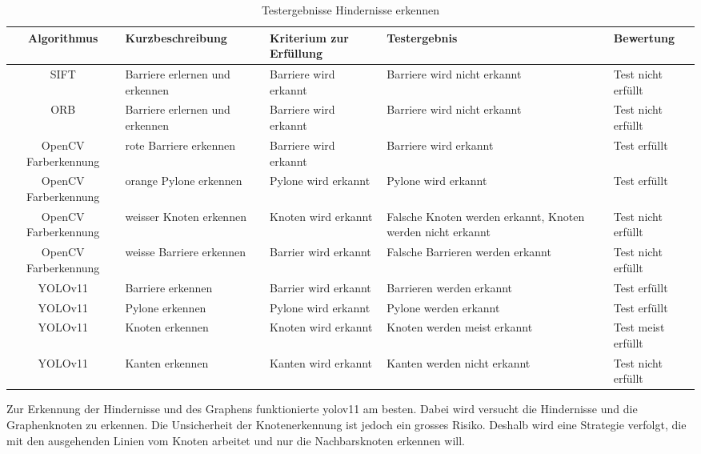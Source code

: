 \begin{table}[H]
\centering
\small
\begin{tabularx}{\textwidth}{|c|X|X|X|l|}
        \hline
        \textbf{Algorithmus} & \textbf{Kurzbeschreibung} & \textbf{Kriterium zur Erfüllung} & \textbf{Testergebnis} & \textbf{Bewertung} \\
        \hline
        SIFT & Barriere erlernen und erkennen & Barriere wird erkannt & Barriere wird nicht erkannt & Test nicht erfüllt \\ \hline
        ORB & Barriere erlernen und erkennen & Barriere wird erkannt & Barriere wird nicht erkannt & Test nicht erfüllt \\ \hline
        OpenCV Farberkennung & rote Barriere erkennen & Barriere wird erkannt & Barriere wird erkannt & Test erfüllt \\ \hline
        OpenCV Farberkennung & orange Pylone erkennen & Pylone wird erkannt & Pylone wird erkannt & Test erfüllt \\ \hline
        OpenCV Farberkennung & weisser Knoten erkennen & Knoten wird erkannt & Falsche Knoten werden erkannt, Knoten werden nicht erkannt & Test nicht erfüllt \\ \hline
        OpenCV Farberkennung & weisse Barriere erkennen & Barrier wird erkannt & Falsche Barrieren werden erkannt & Test nicht erfüllt \\ \hline
        YOLOv11 & Barriere erkennen & Barrier wird erkannt & Barrieren werden erkannt & Test erfüllt \\ \hline
        YOLOv11 & Pylone erkennen & Pylone wird erkannt & Pylone werden erkannt & Test erfüllt \\ \hline
        YOLOv11 & Knoten erkennen & Knoten wird erkannt & Knoten werden meist erkannt & Test meist erfüllt \\ \hline
        YOLOv11 & Kanten erkennen & Kanten wird erkannt & Kanten werden nicht erkannt & Test nicht erfüllt \\ \hline

\end{tabularx}
    \caption{Testergebnisse Hindernisse erkennen}
\label{tab:test-obst-detection}
\end{table}

Zur Erkennung der Hindernisse und des Graphens funktionierte \gls{yolo}v11 am besten. Dabei wird versucht die Hindernisse und die Graphenknoten zu erkennen. Die Unsicherheit der Knotenerkennung ist jedoch ein grosses Risiko. Deshalb wird eine Strategie verfolgt, die mit den ausgehenden Linien vom Knoten arbeitet und nur die Nachbarsknoten erkennen will.


